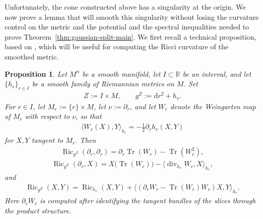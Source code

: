 \documentclass[11pt,reqno]{amsart}
\numberwithin{equation}{section}
\newtheorem{prop}[thm]{Proposition}
\theoremstyle{definition}
\theoremstyle{remark}
\newcommand{\la}{\langle}
\newcommand{\ra}{\rangle}
\renewcommand{\div}{\operatorname{div}}
\newcommand{\Tr}{\operatorname{Tr}}
\newcommand{\ud}{\mathrm{d}}
\newcommand{\0}{\emptyset}
\newcommand{\bbR}{\mathbb R}
\newcommand{\Ric}{\operatorname{Ric}}
\begin{document}
Unfortunately, the cone constructed above has a singularity at the origin. We now prove a lemma that will smooth this singularity without losing the curvature control on the metric and the potential and the spectral inequalities needed to prove Theorem~\ref{thm:gaussian-split-main}. We first recall a technical proposition, based on
\cite[Proposition~4.1]{barGauduchonMoroianu2005}, which will be useful for
computing the Ricci curvature of the smoothed metric.

\begin{prop}\label{prop:generalized-cylinder-curvature}
Let $M^n$ be a smooth manifold, let $I\subset\bbR$ be an interval, and let
$\{h_r\}_{r\in I}$ be a smooth family of Riemannian metrics on $M$. Set
\begin{align}
        Z
        :=
        I\times M,
        \qquad
        g^Z
        :=
        \ud r^2+h_r.
\end{align}
For $r\in I$, let $M_r:=\{r\}\times M$, let $\nu:=\partial_r$, and let
$W_r$ denote the Weingarten map of $M_r$ with respect to $\nu$, so that
\begin{align}\label{eq:generalized-cylinder-Weingarten}
        \la W_r(X),Y\ra_{h_r}
        =
        -\frac12\partial_rh_r(X,Y)
\end{align}
for $X,Y$ tangent to $M_r$. Then
\begin{align}\label{eq:generalized-cylinder-Ricci-radial}
        \Ric_{g^Z}(\partial_r,\partial_r)
        =
        \partial_r\Tr(W_r)-\Tr(W_r^2),
\end{align}
\begin{align}\label{eq:generalized-cylinder-Ricci-mixed}
        \Ric_{g^Z}(\partial_r,X)
        =
        X\bigl(\Tr(W_r)\bigr)
        -
        \la\div_{h_r}W_r,X\ra_{h_r},
\end{align}
and
\begin{align}\label{eq:generalized-cylinder-Ricci-tangential}
        \Ric_{g^Z}(X,Y)
        =
        \Ric_{h_r}(X,Y)
        +
        \la
        \left(
        \partial_rW_r-\Tr(W_r)W_r
        \right)X,
        Y
        \ra_{h_r}.
\end{align}
Here $\partial_rW_r$ is computed after identifying the tangent bundles of
the slices through the product structure.
\end{prop}
\end{document}
